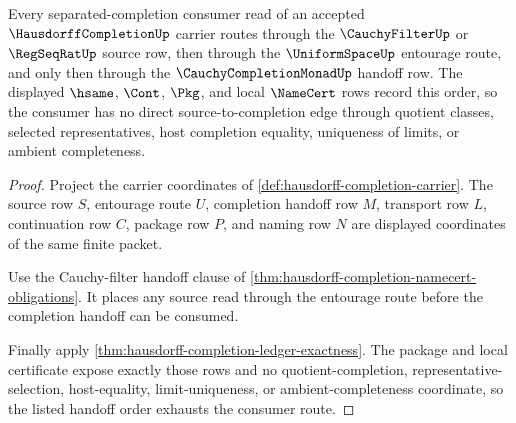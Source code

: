 \begin{theorem}
\label{thm:hausdorff-completion-uniform-entourage-cauchy-handoff}
Every separated-completion consumer read of an accepted $\HausdorffCompletionUp$ carrier routes through the $\CauchyFilterUp$ or $\RegSeqRatUp$ source row, then through the $\UniformSpaceUp$ entourage route, and only then through the $\CauchyCompletionMonadUp$ handoff row. The displayed $\hsame$, $\Cont$, $\Pkg$, and local $\NameCert$ rows record this order, so the consumer has no direct source-to-completion edge through quotient classes, selected representatives, host completion equality, uniqueness of limits, or ambient completeness.
\end{theorem}
\begin{proof}
Project the carrier coordinates of \autoref{def:hausdorff-completion-carrier}. The source row $S$, entourage route $U$, completion handoff row $M$, transport row $L$, continuation row $C$, package row $P$, and naming row $N$ are displayed coordinates of the same finite packet.

Use the Cauchy-filter handoff clause of \autoref{thm:hausdorff-completion-namecert-obligations}. It places any source read through the entourage route before the completion handoff can be consumed.

Finally apply \autoref{thm:hausdorff-completion-ledger-exactness}. The package and local certificate expose exactly those rows and no quotient-completion, representative-selection, host-equality, limit-uniqueness, or ambient-completeness coordinate, so the listed handoff order exhausts the consumer route.
\end{proof}

